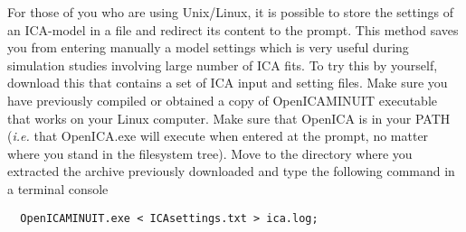 For those of you who are using Unix/Linux, it is possible to store the settings of an ICA-model in a file and redirect its content to the prompt. This method saves you from entering manually a model settings which is very useful during simulation studies involving large number of ICA fits. To try this by yourself, download this  that contains a set of ICA input and setting files.  Make sure you have previously compiled or obtained a copy of OpenICAMINUIT executable that works on your Linux computer. Make sure that OpenICA is in your PATH ({\it i.e.} that OpenICA.exe will execute when entered at the prompt, no matter where you stand in the filesystem tree). Move to the directory where you extracted the archive previously downloaded and type the following command in a terminal console 

\begin{verbatim}  OpenICAMINUIT.exe < ICAsettings.txt > ica.log; \end{verbatim}

